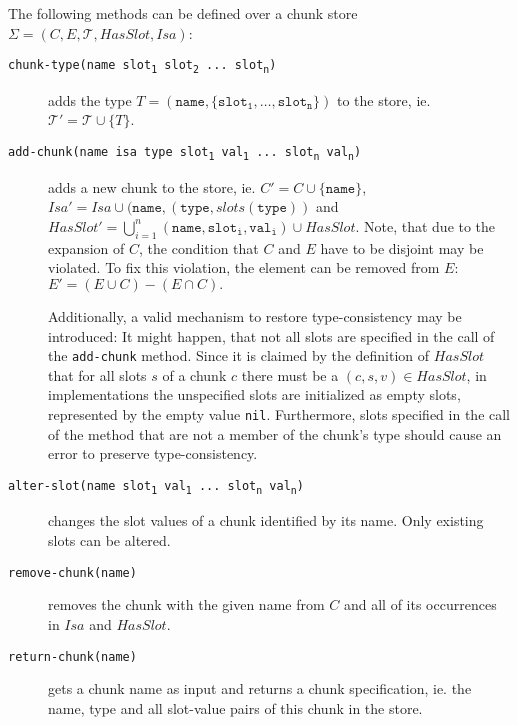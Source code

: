 \begin{definition}
\label{def:abstract_methods_chunk_store}
The following methods can be defined over a chunk store $\Sigma = (C, E, \mathcal{T}, HasSlot, Isa)$:

\begin{description}
 \item[\texttt{chunk-type(name slot\textsubscript{1} slot\textsubscript{2} ... slot\textsubscript{n})}] adds the type $T = (\mathtt{name},\{\mathtt{slot_1}, \dots, \mathtt{slot_n}\})$ to the store, ie. $\mathcal{T'} = \mathcal{T} \cup \{T\}$. 
 \item[\texttt{add-chunk(name isa type slot\textsubscript{1} val\textsubscript{1} ... slot\textsubscript{n} val\textsubscript{n})}] adds a new chunk to the store, ie. $C' = C \cup \{ \mathtt{name} \}$, $Isa' = Isa \cup (\mathtt{name}, (\mathtt{type}, slots(\mathtt{type}))$ and $HasSlot' = \bigcup_{i = 1}^n{\mathtt{(name,slot_i,val_i)}} \cup HasSlot.$ Note, that due to the expansion of $C$, the condition that $C$ and $E$ have to be disjoint may be violated. To fix this violation, the element can be removed from $E$: $E' = (E \cup C) - (E \cap C).$ 
 
 Additionally, a valid mechanism to restore type-consistency may be introduced: It might happen, that not all slots are specified in the call of the \verb|add-chunk| method. Since it is claimed by the definition of $HasSlot$ that for all slots $s$ of a chunk $c$ there must be a $(c,s,v) \in HasSlot$, in implementations the unspecified slots are initialized as empty slots, represented by the empty value \verb|nil|. Furthermore, slots specified in the call of the method that are not a member of the chunk's type should cause an error to preserve type-consistency.
  \item[\texttt{alter-slot(name slot\textsubscript{1} val\textsubscript{1} ... slot\textsubscript{n} val\textsubscript{n})}] changes the slot values of a chunk identified by its name. Only existing slots can be altered.
  \item[\texttt{remove-chunk(name)}] removes the chunk with the given name from $C$ and all of its occurrences in $Isa$ and $HasSlot$.
  \item[\texttt{return-chunk(name)}] gets a chunk name as input and returns a chunk specification, ie. the name, type and all slot-value pairs of this chunk in the store.
\end{description} 
\end{definition}

